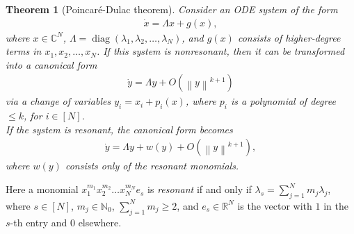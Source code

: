 \documentclass[superscriptaddress,onecolumn,nofootinbib,longbibliography,a4paper,accepted=2026-09-29]{quantumarticle}
\theoremstyle{plain}
\newtheorem{thm}{Theorem}
\theoremstyle{definition}
\numberwithin{thm}{section}
\numberwithin{assumption}{section}
\numberwithin{lemma}{section}
\numberwithin{prop}{section}
\numberwithin{cor}{section}
\numberwithin{definition}{section}
\numberwithin{rmk}{section}
\numberwithin{equation}{section}
\newcommand{\norm}[1]     {\left\| #1 \right\|}
\newcommand{\myC}{\mathbb{C}}
\newcommand{\myN}{\mathbb{N}}
\newcommand{\lrb}[1]{\left ( #1 \right )}
\newcommand{\myO}[1]{O\lrb{#1}}
\newcommand{\diag}[1]{\operatorname{diag}\lrb{#1}}
\begin{document}
\begin{thm}[Poincar\'{e}-Dulac theorem]
    Consider an ODE system of the form
    \begin{align}
        \dot{x}=\Lambda x + g(x),   
    \end{align}
    where $x\in\myC^N$, $\Lambda=\diag{\lambda_1, \lambda_2, \dots, \lambda_N}$, 
    and $g(x)$ consists of  higher-degree terms in $x_1,x_2,\dots,x_N$. If this system is nonresonant, then it can be transformed into a canonical form  
    \begin{align}
        \dot{y}=\Lambda y + \myO{\norm{y}^{k+1}}    
    \end{align}
    via a change of variables $y_i=x_i+p_i(x)$, where $p_i$ is a polynomial of degree $\le k$, for $i \in [N]$. \\
    If the system is resonant, the canonical form becomes 
    \begin{align}
        \dot{y}=\Lambda y + w(y) + \myO{\norm{y}^{k+1}}    ,
    \end{align}
    where $w(y)$ consists only of the resonant monomials.
    \label{thm:poincare-dulac}
\end{thm}
Here a monomial $x_1^{m_1}x_2^{m_2}\dots x_N^{m_N} e_s$ is \emph{resonant} if and only if $\lambda_s=\sum_{j=1}^N m_j \lambda_j$, where $s \in [N]$, $m_j \in \myN_0$, $\sum_{j=1}^N m_j \ge 2$, and $e_s \in \mathbb{R}^N$ is the vector with 
$1$ in the $s$-th entry and $0$ elsewhere.
\end{document}
